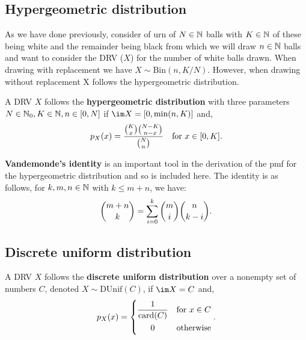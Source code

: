 \documentclass[../Year1/Year1.tex]{subfiles}
\begin{document}
\subsection{Hypergeometric distribution}
As we have done previously, consider of urn of $N\in\mathbb{N}$ balls with $K\in\mathbb{N}$ of these being white and the remainder being black from which we will draw $n\in\mathbb{N}$ balls and want to consider the DRV ($X$) for the number of white balls drawn. When drawing with replacement we have $X \sim \text{Bin}(n,K/N)$. However, when drawing without replacement X follows the hypergeometric distribution.

\begingroup\belowdisplayskip=0pt
\begin{definition}
    A DRV $X$ follows the \textbf{hypergeometric distribution} with three parameters $N\in\mathbb{N}_0, K\in\mathbb{N},n\in[0,N]$ if $\im X = [0,\text{min}(n,K)]$ and, \[
        p_X(x) = \frac{\binom{K}{x}\binom{N-K}{n-x}}{\binom{N}{n}} \quad \text{\textcolor{black}{for }$x\in[0,K]$}\textcolor{black}{.}
    \]
\end{definition}
\endgroup

\begingroup\belowdisplayskip=-10pt
\begin{lemma}
    \textbf{Vandemonde's identity} is an important tool in the derivation of the pmf for the hypergeometric distribution and so is included here. The identity is as follows, for $k,m,n \in \mathbb{N}$ with $k\leq m+n$, we have:
     \[
        \binom{m+n}{k} = \sum_{i=0}^k\binom{m}{i}\binom{n}{k-i}\textcolor{black}{.}
     \]
\end{lemma}
\endgroup

\subsection{Discrete uniform distribution}
\begingroup\belowdisplayskip=-10pt
\begin{definition}
    A DRV $X$ follows the \textbf{discrete uniform distribution} over a nonempty set of numbers $C$, denoted $X \sim \text{DUnif}(C)$, if $\im X = C$ and,
    \[
        p_X(x)=
        \begin{dcases}
            \frac{1}{\text{card}(C)} & \text{\textcolor{black}{for }$x\in C$} \\
            \omit\hfil0\hfil & \text{\textcolor{black}{otherwise}}
        \end{dcases}\textcolor{black}{.}
    \]
\end{definition}
\endgroup
\end{document}
